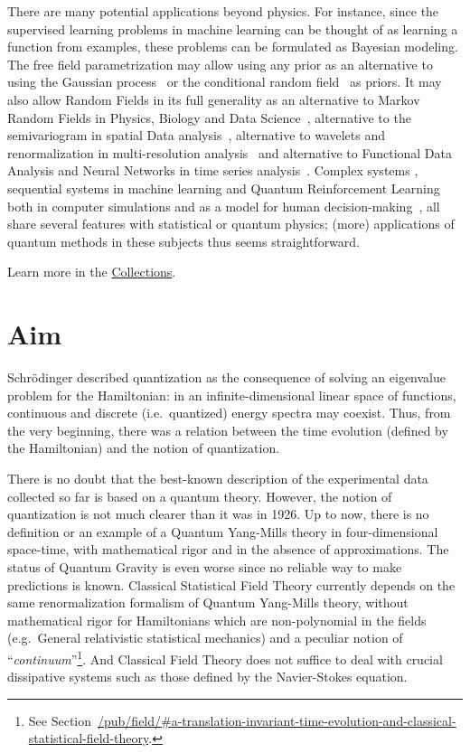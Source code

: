 \documentclass[11pt]{book}
\begin{document}
There are many potential applications beyond physics. For instance,
since the supervised learning problems in machine learning can be
thought of as learning a function from examples, these problems can be
formulated as Bayesian
modeling\cite{Rasmussen2006Gaussian}. The free field parametrization may allow using any prior as an
alternative to using the Gaussian
process~\cite{Rasmussen2006Gaussian} or the conditional random
field~\cite{Chatzis2013infinite} as priors. It may also allow Random Fields in its full generality
as an alternative to Markov Random Fields in Physics, Biology and Data
Science~\cite{Hernuxe1ndez2021Random}, alternative to the semivariogram in spatial Data
analysis~\cite{Oliver2005Statistical}, alternative to wavelets and renormalization in
multi-resolution
analysis~\cite{Battle1999Wavelets} and
alternative to Functional Data Analysis and Neural Networks in time
series analysis~\cite{Perdices2021Deep}. Complex systems
\cite{Bertin2016Statistical},
sequential systems in machine learning
\cite{Thon2015Links} and
Quantum Reinforcement Learning both in computer simulations and as a
model for human
decision-making~\cite{Li2020Quantum}, all share several features with statistical or quantum physics;
(more) applications of quantum methods in these subjects thus seems
straightforward.

Learn more in the \href{collections}{Collections}.

\hypertarget{aim}{%
\section{Aim}\label{aim}}

Schrödinger described quantization as the consequence of solving an
eigenvalue problem for the
Hamiltonian\cite{Schruxf6dinger1926undulatory}: in an infinite-dimensional linear space of functions, continuous
and discrete (i.e.~quantized) energy spectra may coexist. Thus, from the
very beginning, there was a relation between the time evolution (defined
by the Hamiltonian) and the notion of quantization.

There is no doubt that the best-known description of the experimental
data collected so far is based on a quantum
theory\cite{Olive2014Review}.
However, the notion of quantization is not much clearer than it was in
1926\cite{Todorov2012Quantization}. Up
to now, there is no definition or an example of a Quantum Yang-Mills
theory in four-dimensional space-time, with mathematical rigor and in
the absence of
approximations\cite{Jaffe2006Quantum}. The status of Quantum Gravity is even worse since no reliable
way to make predictions is
known\cite{Pullin2020Loop}.
Classical Statistical Field Theory currently depends on the same
renormalization formalism of Quantum Yang-Mills
theory\cite{Mussardo2010Statistical},
without mathematical rigor for Hamiltonians which are non-polynomial in
the fields (e.g.~General relativistic statistical
mechanics\cite{Rovelli2013General})
and a peculiar notion of ``\emph{continuum}''\footnote{See
  Section~\url{/pub/field/\#a-translation-invariant-time-evolution-and-classical-statistical-field-theory}.}.
And Classical Field Theory does not suffice to deal with crucial
dissipative systems such as those defined by the Navier-Stokes
equation\cite{prize2}.
\end{document}
